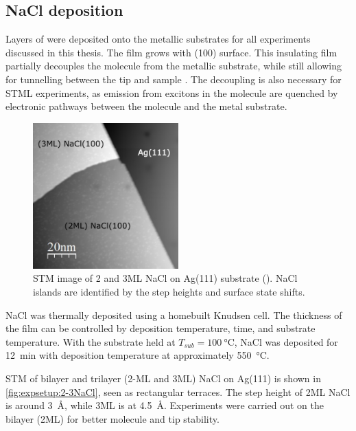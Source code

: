 \subsection*{NaCl deposition}

Layers of  were deposited onto the metallic substrates for all experiments discussed in this thesis. The film grows with (100) surface. This insulating film partially decouples the molecule from the metallic substrate, while still allowing for tunnelling between the tip and sample \citep{repp2005molecules}. The decoupling is also necessary for \ac{STML} experiments, as emission from excitons in the molecule are quenched by electronic pathways between the molecule and the metal substrate.

\begin{figure} [H]
    \centering
    \includegraphics[width=0.5\textwidth]{pictures/nacl_example.png}
    \caption{STM image of 2 and 3ML NaCl on Ag(111) substrate (). NaCl islands are identified by the step heights and surface state shifts. }
    \label{fig:expsetup:2-3NaCl}
\end{figure}

NaCl was thermally deposited using a homebuilt Knudsen cell. The thickness of the film can be controlled by deposition temperature, time, and substrate temperature. With the substrate held at $T_{sub} = \SI{100}{\celsius}$, NaCl was deposited for \SI{12}{\minute} with deposition temperature at approximately \SI{550}{\celsius}. 

\ac{STM} of bilayer and trilayer (2-\acf{ML} and 3\ac{ML}) NaCl on Ag(111) is shown in \autoref{fig:expsetup:2-3NaCl}, seen as rectangular terraces. The step height of 2\ac{ML} NaCl is around \SI{3}{\angstrom}, while 3\ac{ML} is at \SI{4.5}{\angstrom}. Experiments were carried out on the bilayer (2\ac{ML}) for better molecule and tip stability.


